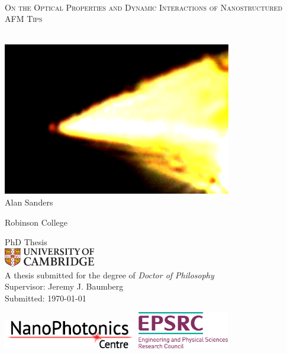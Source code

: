 \documentclass{book}
\begin{document}
\begin{titlepage}
    \centering
    ~\\[1.cm]
    \fontsize{20pt}{2.em}\selectfont
    \textsc{On the Optical Properties and Dynamic Interactions of Nanostructured AFM Tips} \par ~\\
    \includegraphics[width=10cm]{title_image} \\
    \fontsize{14pt}{1em}\selectfont Alan Sanders \par
    \fontsize{12pt}{1em}\selectfont Robinson College \par
    PhD Thesis \\[0.5cm]
    \includegraphics[trim=0 0 270 0, clip, width=4cm]{uc-pantone} \\[0.5cm]
    A thesis submitted for the degree of \emph{Doctor of Philosophy} \\
    Supervisor: Jeremy J. Baumberg \\
    Submitted: \today \par
    \vfill
    \flushleft
    \includegraphics[height=1.2cm]{np_logo_2}
    \hfill
    \includegraphics[height=1.6cm]{sponsor}
\end{titlepage}
\end{document}

